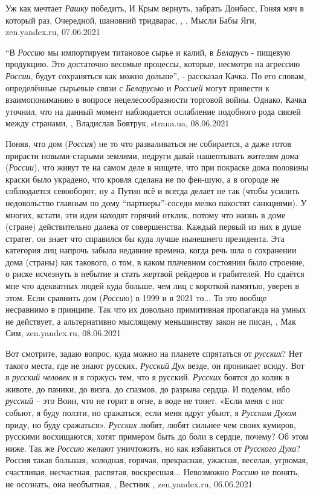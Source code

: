 Уж как мечтает \emph{Рашку} победить, И Крым вернуть, забрать Донбасс, Гоняя
мяч в который раз, Очередной, шановний тридварас,
,
, Мысли Бабы Яги, zen.yandex.ru, 07.06.2021

\enquote{В \emph{Россию} мы импортируем титановое сырье и калий, в
\emph{Беларусь} - пищевую продукцию. Это достаточно весомые процессы, которые,
несмотря на агрессию \emph{России}, будут сохраняться как можно дольше}, -
рассказал Качка.  По его словам, определённые сырьевые связи с \emph{Беларусью}
и \emph{Россией} могут привести к взаимопониманию в вопросе нецелесообразности
торговой войны.  Однако, Качка уточнил, что на данный момент наблюдается
ослабление подобного рода связей между странами,
, Владислав Бовтрук, strana.ua, 08.06.2021

Поняв, что дом (\emph{Россия}) не то что разваливаться не собирается, а даже готов
прирасти новыми-старыми землями, недруги давай нашептывать жителям дома
(\emph{России}), что живут те на самом деле в нищете, что при покраске дома половины
краски было украдено, что кровля сделана не по фен-шую, а в огороде не
соблюдается севооборот, ну а Путин всё и всегда делает не так (чтобы усилить
недовольство главным по дому \enquote{партнеры}-соседи мелко пакостят санкциями). У
многих, кстати, эти идеи находят горячий отклик, потому что жизнь в доме
(стране) действительно далека от совершенства. Каждый первый из них в душе
стратег, он знает что справился бы куда лучше нынешнего президента. Эта
категория лиц напрочь забыла недавние времена, когда речь шла о сохранении дома
(страны) как такового, о том, в каком плачевном состоянии было строение, о
риске исчезнуть в небытие и стать жертвой рейдеров и грабителей.  Но сдаётся
мне что адекватных людей куда больше, чем лиц с короткой памятью, уверен в
этом. Если сравнить дом (\emph{Россию}) в 1999 и в 2021 то... То это вообще несравнимо
в принципе. Так что их довольно примитивная пропаганда на умных не действует, а
альтернативно мыслящему меньшинству закон не писан,
, Мак Сим, zen.yandex.ru, 08.06.2021

Вот смотрите, задаю вопрос, куда можно на планете спрятаться от \emph{русских}?
Нет такого места, где не знают русских, \emph{Русский Дух} везде, он проникает
всюду.  Вот я \emph{русский человек} и я горжусь тем, что я русский.
\emph{Русских} боятся до колик в животе, до паники, до визга, до спазмов, до
разрыва сердца. И поделом, ибо \emph{русский} – это Воин, что не горит в огне,
в воде не тонет. «Если меня с ног собьют, я буду ползти, но сражаться, если
меня вдруг убьют, я \emph{Русским Духом} приду, но буду сражаться».
\emph{Русских} любят, любят сильнее чем своих кумиров, русскими восхищаются,
хотят примером быть до боли в сердце, почему? Об этом ниже.  Так же
\emph{Россию} желают уничтожить, но как избавиться от \emph{Русского Духа}? Россия
такая большая, холодная, горячая, прекрасная, ужасная, веселая, угрюмая,
счастливая, несчастная, распятая, воскресшая... Невозможно \emph{Россию} не
понять, не осознать, она необъятная,
, Вестник , zen.yandex.ru, 06.06.2021

